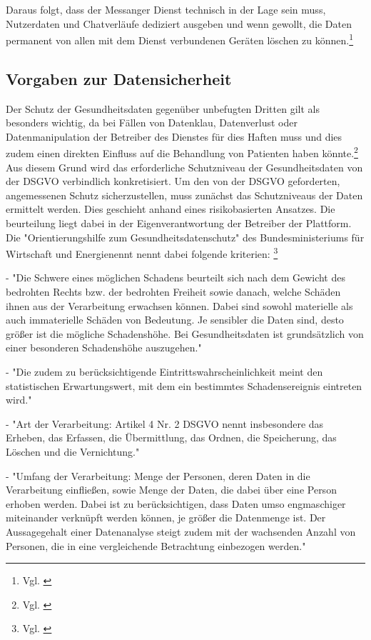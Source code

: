Daraus folgt, dass der Messanger Dienst technisch in der Lage sein muss, Nutzerdaten und Chatverläufe dediziert ausgeben und wenn gewollt, die Daten permanent von allen mit dem Dienst verbundenen Geräten löschen zu können.\footnote{Vgl. \cite[S. 36 ff.]{OrientierungshilfezumGesundheitsdatenschutz2018}}

\subsection{Vorgaben zur Datensicherheit}\label{subsection:vzd}
Der Schutz der Gesundheitsdaten gegenüber unbefugten Dritten gilt als besonders wichtig, da bei Fällen von Datenklau, Datenverlust oder Datenmanipulation der Betreiber des Dienstes für dies Haften muss und dies zudem einen direkten Einfluss auf die Behandlung von Patienten haben könnte.\footnote{Vgl. \cite[S. 3]{OrientierungshilfezumGesundheitsdatenschutz2018}} Aus diesem Grund wird das erforderliche Schutzniveau der Gesundheitsdaten von der DSGVO verbindlich konkretisiert.
Um den von der DSGVO geforderten, angemessenen Schutz sicherzustellen, muss zunächst das Schutzniveaus der Daten ermittelt werden.
Dies geschieht anhand eines risikobasierten Ansatzes. Die beurteilung liegt dabei in der Eigenverantwortung der Betreiber der Plattform. Die "Orientierungshilfe zum Gesundheitsdatenschutz" des Bundesministeriums für Wirtschaft und Energienennt nennt dabei folgende kriterien:
\footnote{Vgl. \cite[S. 41 ff.]{OrientierungshilfezumGesundheitsdatenschutz2018}}

- "Die Schwere eines möglichen Schadens beurteilt sich nach dem Gewicht des bedrohten Rechts bzw. der bedrohten Freiheit sowie danach, welche Schäden ihnen aus der Verarbeitung erwachsen können. Dabei sind sowohl materielle als auch immaterielle Schäden von Bedeutung. Je sensibler die Daten sind, desto größer ist die mögliche Schadenshöhe. Bei Gesundheitsdaten ist grundsätzlich von einer besonderen Schadenshöhe auszugehen."

- "Die zudem zu berücksichtigende Eintrittswahrscheinlichkeit meint den statistischen Erwartungswert, mit dem ein bestimmtes Schadensereignis eintreten wird."

- "Art der Verarbeitung: Artikel 4 Nr. 2 DSGVO nennt insbesondere das Erheben, das Erfassen, die Übermittlung, das Ordnen, die Speicherung, das Löschen und die Vernichtung."

- "Umfang der Verarbeitung: Menge der Personen, deren Daten in die Verarbeitung einfließen, sowie Menge der Daten, die dabei über eine Person erhoben werden. Dabei ist zu berücksichtigen, dass Daten umso engmaschiger miteinander verknüpft werden können, je größer die Datenmenge ist. Der Aussagegehalt einer Datenanalyse steigt zudem mit der wachsenden Anzahl von Personen, die in eine vergleichende Betrachtung einbezogen werden."

